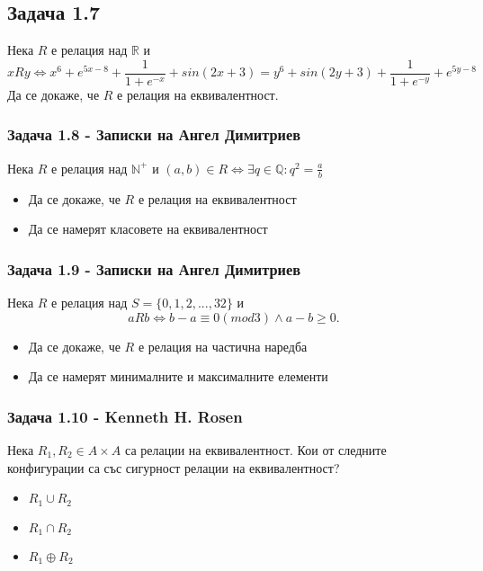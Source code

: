 \documentclass[12pt]{article}
\begin{document}
\subsection*{Задача 1.7}
Нека $R$ е релация над $\mathbb{R}$ и 
\begin{equation*}
    xRy \iff x^6 + e^{5x - 8} + \frac{1}{1+e^{-x}} + sin(2x + 3) = y^6 + sin(2y + 3) + \frac{1}{1+e^{-y}} + e^{5y - 8}
\end{equation*}
Да се докаже, че $R$ е релация на еквивалентност.

\subsubsection*{Задача 1.8 - Записки на Ангел Димитриев}
Нека $R$ е релация над $\mathbb{N}^+$ и $(a, b) \in R \iff \exists q \in \mathbb{Q}: q^2 = \frac{a}{b}$
\begin{itemize}
    \item Да се докаже, че $R$ е релация на еквивалентност
    \item Да се намерят класовете на еквивалентност
\end{itemize}

\subsubsection*{Задача 1.9 - Записки на Ангел Димитриев}
Нека $R$ е релация над $S = \{ 0, 1, 2, ..., 32 \}$ и 
\begin{equation*}
    aRb \iff b - a \equiv 0 (mod 3) \land a - b \geq 0.
\end{equation*}

\begin{itemize}
    \item Да се докаже, че $R$ е релация на частична наредба
    \item Да се намерят минималните и максималните елементи
\end{itemize}

\subsubsection*{Задача 1.10 - Kenneth H. Rosen}
Нека $R_1, R_2 \in A \times A$ са релации на еквивалентност. Кои от следните конфигурации са със сигурност релации на еквивалентност?
\begin{itemize}
    \item $R_1 \cup R_2$
    \item $R_1 \cap R_2$
    \item $R_1 \oplus R_2$
\end{itemize}
\end{document}
